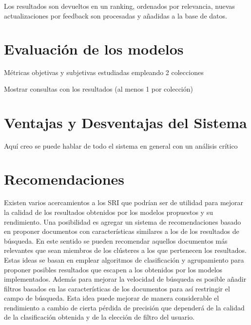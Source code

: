 \documentclass[12pt]{llncs}
\begin{document}
Los resultados son devueltos en un ranking, ordenados por relevancia, nuevas actualizaciones por feedback son procesadas y añadidas a la base de datos.

\section{Evaluación de los modelos}

Métricas objetivas y subjetivas estudiadas empleando 2 colecciones

Mostrar consultas con los resultados (al menos 1 por colección)

\section{Ventajas y Desventajas del Sistema}

Aquí creo se puede hablar de todo el sistema en general con un análisis crítico

\section*{Recomendaciones}

Existen varios acercamientos a los SRI que podrían ser de utilidad para mejorar la calidad de los resultados obtenidos por los modelos propuestos y su rendimiento. Una posibilidad es agregar un sistema de recomendaciones basado en proponer documentos con características similares a los de los resultados de búsqueda. En este sentido se pueden recomendar aquellos documentos más relevantes que sean miembros de los clústeres a los que pertenecen los resultados. Estas ideas se basan en emplear algoritmos de clasificación y agrupamiento para proponer posibles resultados que escapen a los obtenidos por los modelos implementados. Además para mejorar la velocidad de búsqueda es posible añadir filtros basados en las características de los documentos para así restringir el campo de búsqueda. Esta idea puede mejorar de manera considerable el rendimiento a cambio de cierta pérdida de precisión que dependerá de la calidad de la clasificación obtenida y de la elección de filtro del usuario.


 

\end{document}
